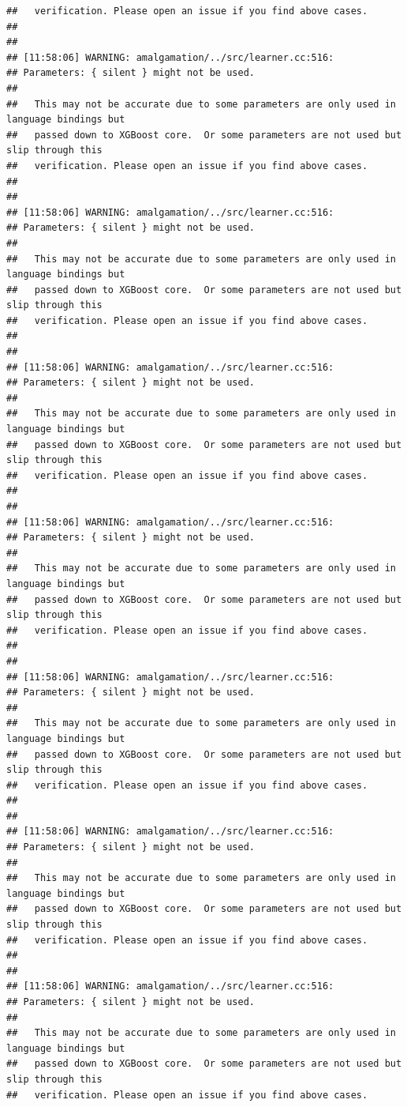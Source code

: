 \documentclass[AMS,STIX2COL]{WileyNJD-v2}\usepackage[]{graphicx}\usepackage[]{color}
\makeatletter
\newenvironment{kframe}{%
 \def\at@end@of@kframe{}%
 \ifinner\ifhmode%
  \def\at@end@of@kframe{\end{minipage}}%
  \begin{minipage}{\columnwidth}%
 \fi\fi%
 \def\FrameCommand##1{\hskip\@totalleftmargin \hskip-\fboxsep
 \colorbox{shadecolor}{##1}\hskip-\fboxsep
     \hskip-\linewidth \hskip-\@totalleftmargin \hskip\columnwidth}%
 \MakeFramed {\advance\hsize-\width
   \@totalleftmargin\z@ \linewidth\hsize
   \@setminipage}}%
 {\par\unskip\endMakeFramed%
 \at@end@of@kframe}
\newenvironment{knitrout}{}{} %
\makeatother
\begin{document}
\begin{knitrout}
\begin{kframe}
\begin{verbatim}
##   verification. Please open an issue if you find above cases.
## 
## 
## [11:58:06] WARNING: amalgamation/../src/learner.cc:516: 
## Parameters: { silent } might not be used.
## 
##   This may not be accurate due to some parameters are only used in language bindings but
##   passed down to XGBoost core.  Or some parameters are not used but slip through this
##   verification. Please open an issue if you find above cases.
## 
## 
## [11:58:06] WARNING: amalgamation/../src/learner.cc:516: 
## Parameters: { silent } might not be used.
## 
##   This may not be accurate due to some parameters are only used in language bindings but
##   passed down to XGBoost core.  Or some parameters are not used but slip through this
##   verification. Please open an issue if you find above cases.
## 
## 
## [11:58:06] WARNING: amalgamation/../src/learner.cc:516: 
## Parameters: { silent } might not be used.
## 
##   This may not be accurate due to some parameters are only used in language bindings but
##   passed down to XGBoost core.  Or some parameters are not used but slip through this
##   verification. Please open an issue if you find above cases.
## 
## 
## [11:58:06] WARNING: amalgamation/../src/learner.cc:516: 
## Parameters: { silent } might not be used.
## 
##   This may not be accurate due to some parameters are only used in language bindings but
##   passed down to XGBoost core.  Or some parameters are not used but slip through this
##   verification. Please open an issue if you find above cases.
## 
## 
## [11:58:06] WARNING: amalgamation/../src/learner.cc:516: 
## Parameters: { silent } might not be used.
## 
##   This may not be accurate due to some parameters are only used in language bindings but
##   passed down to XGBoost core.  Or some parameters are not used but slip through this
##   verification. Please open an issue if you find above cases.
## 
## 
## [11:58:06] WARNING: amalgamation/../src/learner.cc:516: 
## Parameters: { silent } might not be used.
## 
##   This may not be accurate due to some parameters are only used in language bindings but
##   passed down to XGBoost core.  Or some parameters are not used but slip through this
##   verification. Please open an issue if you find above cases.
## 
## 
## [11:58:06] WARNING: amalgamation/../src/learner.cc:516: 
## Parameters: { silent } might not be used.
## 
##   This may not be accurate due to some parameters are only used in language bindings but
##   passed down to XGBoost core.  Or some parameters are not used but slip through this
##   verification. Please open an issue if you find above cases.

\end{verbatim}
\end{kframe}
\end{knitrout}
\end{document}

